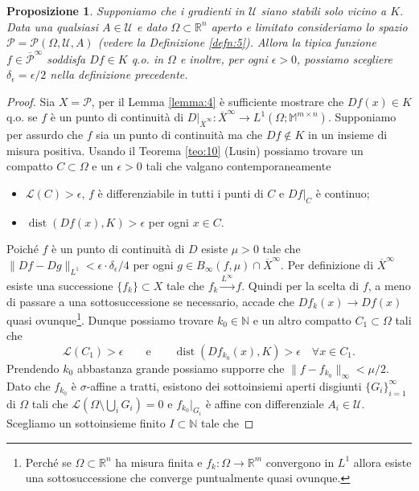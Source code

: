 \documentclass[a4paper,11pt]{book}
\theoremstyle{plain}
\newtheorem{prop}[teo]{Proposizione}
\theoremstyle{definition}
\theoremstyle{remark}
\newcommand{\R}{\mathbb{R}}
\newcommand{\N}{\mathbb{N}}
\newcommand{\M}{\mathbb{M}}
\newcommand{\LL}{\mathscr{L}}
\newcommand{\norm}[1]{\lVert#1\rVert}
\DeclareMathOperator{\dist}{dist}
\begin{document}
\begin{prop}\label{prop:3}
	Supponiamo che i gradienti in $\mathcal{U}$ siano stabili solo vicino a $K$. Data una qualsiasi $A\in\mathcal{U}$ e dato $\Omega\subset \R^n$ aperto e limitato consideriamo lo spazio $\mathscr{P}=\mathscr{P}(\Omega,\mathcal{U},A)$ (vedere la Definizione \ref{defn:5}). Allora la tipica funzione $f\in\overline{\mathscr{P}}^{\infty}$ soddisfa $Df\in K$ q.o. in $\Omega$ e inoltre, per ogni $\epsilon > 0$, possiamo scegliere $\delta_{\epsilon} = \epsilon/2$ nella definizione precedente.
\end{prop}
\begin{proof}
	Sia $X=\mathscr{P}$, per il Lemma \ref{lemma:4} è sufficiente mostrare che $Df(x)\in K$ q.o. se $f$ è un punto di continuità di $D|_{\overline{X}^{\infty}}:\overline{X}^{\infty}\to L^{1}(\Omega;\M^{m\times n})$. Supponiamo per assurdo che $f$ sia un punto di continuità ma che $Df\not\in K$ in un insieme di misura positiva. Usando il Teorema \ref{teo:10} (Lusin) possiamo trovare un compatto $C\subset \Omega$ e un $\epsilon>0$ tali che valgano contemporaneamente
	\begin{itemize}
		\item $\LL(C)>\epsilon$, $f$ è differenziabile in tutti i punti di $C$ e $Df|_{C}$ è continuo;
		\item $\dist(Df(x),K)>\epsilon$ per ogni $x\in C$.
	\end{itemize}
    Poiché $f$ è un punto di continuità di $D$ esiste $\mu>0$ tale che $\norm{Df-Dg}_{L^1}<\epsilon\cdot \delta_{\epsilon}/4$ per ogni $g\in B_{\infty}(f,\mu)\cap \overline{X}^{\infty}$. Per definizione di $\overline{X}^{\infty}$ esiste una successione $\{f_{k}\}\subset X$ tale che $f_k\xrightarrow{L^{\infty}}f$. Quindi per la scelta di $f$, a meno di passare a una sottosuccessione se necessario, accade che $Df_k(x)\to Df(x)$ quasi ovunque\footnote{Perché se $\Omega\subset \R^n$ ha misura finita e $f_k:\Omega\to\R^m$ convergono in $L^1$ allora esiste una sottosuccessione che converge puntualmente quasi ovunque.}. Dunque possiamo trovare $k_0\in\N$ e un altro compatto $C_1\subset \Omega$ tali che
    \begin{equation}\label{eq:16}
        \LL(C_1)>\epsilon\qquad \text{e}\qquad\dist(Df_{k_0}(x),K)>\epsilon\quad\forall x\in C_1.
    \end{equation}
    Prendendo $k_0$ abbastanza grande possiamo supporre che $\norm{f-f_{k_0}}_{\infty}<\mu/2$. Dato che $f_{k_0}$ è $\sigma$-affine a tratti, esistono dei sottoinsiemi aperti disgiunti $\{G_i\}_{i=1}^{\infty}$ di $\Omega$ tali che $\LL\left(\Omega\setminus\bigcup_iG_i\right)=0$ e $f_{k_0}|_{G_i}$ è affine con differenziale $A_i\in\mathcal{U}$. Scegliamo un sottoinsieme finito $I\subset \N$ tale che 

\end{proof}
\end{document}
